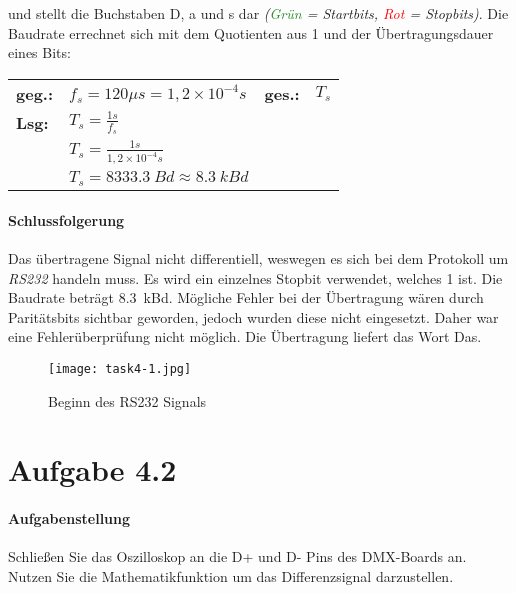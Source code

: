\noindent und stellt die Buchstaben \glqq{}D\grqq{}, \glqq{}a\grqq{} und \glqq{}s\grqq{} dar \textit{(\textcolor{ForestGreen}{Grün} = Startbits, \textcolor{red}{Rot} = Stopbits)}. Die Baudrate errechnet sich mit dem Quotienten aus 1 und der Übertragungsdauer eines Bits:\\

\begin{tabular}{llll}
	\textbf{geg.:} & $f_s = 120 \mu s = 1,2 \times 10^{-4} s$      & \textbf{ges.:} & $T_s$ \\
	\textbf{Lsg:}  & $T_s = \frac{1s}{f_s}$                        &                &       \\
	               & $T_s = \frac{1s}{1,2 \times 10^{-4}s}$        &                &       \\
	               & $T_s = \SI{8333,3}{Bd} \approx \SI{8,3}{kBd}$ &                &
\end{tabular}

\paragraph{Schlussfolgerung}
Das übertragene Signal nicht differentiell, weswegen es sich bei dem Protokoll um \textit{RS232} handeln muss. Es wird ein einzelnes Stopbit verwendet, welches 1 ist. Die Baudrate beträgt \SI{8,3}{kBd}. Mögliche Fehler bei der Übertragung wären durch Paritätsbits sichtbar geworden, jedoch wurden diese nicht eingesetzt. Daher war eine Fehlerüberprüfung nicht möglich. Die Übertragung liefert das Wort \glqq{}Das\grqq{}.

\begin{figure}[!h]
	\centering
	\texttt{[image: task4-1.jpg]}
	\caption{Beginn des RS232 Signals}
	\label{task4-1-img}
\end{figure}

\section{Aufgabe 4.2}
\paragraph{Aufgabenstellung}
Schließen Sie das Oszilloskop an die D+ und D- Pins des DMX-Boards an. Nutzen Sie die Mathematikfunktion um das Differenzsignal darzustellen.

